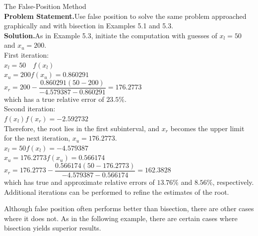 \documentclass[../main.tex]{subfiles}
\begin{document}
\begin{example} The False-Position Method\\

    \noindent\textbf{Problem Statement.}\quad Use false position to solve the same problem approached graphically
    and with bisection in Examples 5.1 and 5.3.\\

    \noindent\textbf{Solution.}\quad As in Example 5.3, initiate the computation with guesses of $x_l = 50$ and
    $x_u = 200$.\\

    \noindent First iteration:\\

    $x_l = 50\text{ }$ \indent$f(x_l)$\\

    $x_u=200$\indent$f(x_u)=0.860291$\\

    $x_r=200-\dfrac{0.860291(50 - 200)}{-4.579387 - 0.860291}=176.2773$\\

    \noindent which has a true relative error of $23.5\%$.\\

    \noindent Second iteration:\\

    $f(x_l)f(x_r)=-2.592732$\\

    \noindent Therefore, the root lies in the first subinterval, and $x_r$ becomes the upper limit for the next
    iteration, $x_u = 176.2773$.\\

    $x_l=50$\hspace{22.5mm}$f(x_l) = -4.579387$\\

    $x_u=176.2773$\indent$f(x_u)=0.566174$\\

    $x_r=176.2773-\dfrac{0.566174(50 - 176.2773)}{-4.579387 - 0.566174}=162.3828$\\

    \noindent which has true and approximate relative errors of $13.76\%$ and $8.56\%$, respectively. Additional
    iterations can be performed to refine the estimates of the root.
\end{example}

Although false position often performs better than bisection, there are other cases
where it does not. As in the following example, there are certain cases where bisection
yields superior results.\\
\end{document}
